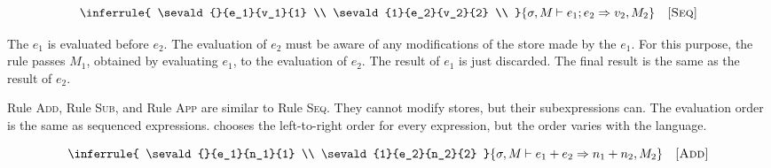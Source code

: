 
\vspace{-1em}

\[
  \inferrule
  {
    \sevald{}{e_1}{v_1}{1} \\
    \sevald{1}{e_2}{v_2}{2} \\
  }
  { \sevald{}{\eseq{e_1}{e_2}}{v_2}{2} }
  \quad\textsc{[Seq]}
\]

The $e_1$ is evaluated before $e_2$. The evaluation of $e_2$ must be aware of
any modifications of the store made by the $e_1$.
For this purpose, the rule passes $M_1$, obtained by evaluating
$e_1$, to the evaluation of $e_2$. The result of $e_1$ is just discarded.
The final result is the same as the result of $e_2$.

Rule \textsc{Add}, Rule \textsc{Sub}, and Rule \textsc{App} are similar to
Rule \textsc{Seq}. They cannot modify stores, but their subexpressions can. The
evaluation order is the same as sequenced expressions. \lang chooses
the left-to-right order for every expression, but the order varies with the language.


\vspace{-1em}

\[
  \inferrule
  {
    \sevald{}{e_1}{n_1}{1} \\
    \sevald{1}{e_2}{n_2}{2}
  }
  { \sevald{}{\eadd{e_1}{e_2}}{n_1+n_2}{2} }
  \quad\textsc{[Add]}
\]

\vspace{-1em}


